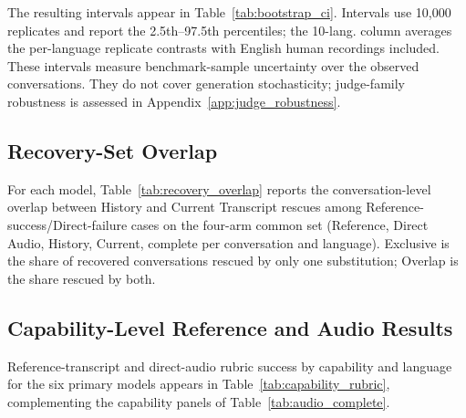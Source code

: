 The resulting intervals appear in Table~\ref{tab:bootstrap_ci}. Intervals use 10{,}000 replicates and report the 2.5th--97.5th percentiles; the 10-lang. column averages the per-language replicate contrasts with English human recordings included. These intervals measure benchmark-sample uncertainty over the observed conversations. They do not cover generation stochasticity; judge-family robustness is assessed in Appendix~\ref{app:judge_robustness}.



\subsection{Recovery-Set Overlap}

\label{app:recovery_overlap}

For each model, Table~\ref{tab:recovery_overlap} reports the conversation-level overlap between History and Current Transcript rescues among Reference-success/Direct-failure cases on the four-arm common set (Reference, Direct Audio, History, Current, complete per conversation and language). Exclusive is the share of recovered conversations rescued by only one substitution; Overlap is the share rescued by both.



\subsection{Capability-Level Reference and Audio Results}

Reference-transcript and direct-audio rubric success by capability and language for the six primary models appears in Table~\ref{tab:capability_rubric}, complementing the capability panels of Table~\ref{tab:audio_complete}.

